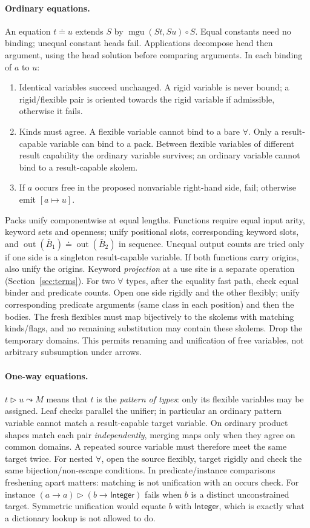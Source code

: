 \documentclass[11pt]{article}
\theoremstyle{definition}
\newcommand{\pack}{\operatorname{out}}
\newcommand{\Int}{\mathsf{Integer}}
\newcommand{\eqs}{\doteq}
\newcommand{\mgu}{\operatorname{mgu}}
\newcommand{\oneway}{\mathrel{\triangleright}}
\newcommand{\arr}{\mathbin{\to}}
\begin{document}
\paragraph{Ordinary equations.}
An equation $t\eqs u$ extends $S$ by
$\mgu(St,Su)\circ S$. Equal constants need no binding; unequal constant
heads fail. Applications decompose head then argument, using the head
solution before comparing arguments. In each binding of $a$ to $u$:
\begin{enumerate}
 \item Identical variables succeed unchanged. A rigid variable is never
 bound; a rigid/flexible pair is oriented towards the rigid variable if
 admissible, otherwise it fails.
 \item Kinds must agree. A flexible variable cannot bind to a bare $\forall$.
 Only a result-capable variable can bind to a pack. Between flexible variables
 of different result capability the ordinary variable survives; an ordinary
 variable cannot bind to a result-capable skolem.
 \item If $a$ occurs free in the proposed nonvariable right-hand side, fail;
 otherwise emit $[a\mapsto u]$.
\end{enumerate}
Packs unify componentwise at equal lengths. Functions require equal input
arity, keyword sets and openness; unify positional slots, corresponding
keyword slots, and $\pack(\bar B_1)\eqs\pack(\bar B_2)$ in sequence.
Unequal output counts are tried only if one side is a singleton
result-capable variable. If both functions carry origins, also unify the
origins. Keyword \emph{projection} at a use site is a separate operation
(Section~\ref{sec:terms}). For two $\forall$ types, after the equality fast
path, check equal binder and predicate counts. Open one side rigidly and the
other flexibly; unify corresponding predicate arguments (same class in each
position) and then the bodies. The fresh flexibles must map bijectively to
the skolems with matching kinds/flags, and no remaining substitution may
contain these skolems. Drop the temporary domains. This permits renaming
and unification of free variables, not arbitrary subsumption under arrows.

\paragraph{One-way equations.}
$t\oneway u\leadsto M$ means that $t$ is the \emph{pattern of types}:
only its flexible variables may be assigned. Leaf checks parallel the
unifier; in particular an ordinary pattern variable cannot match a
result-capable target variable. On ordinary product shapes match each pair
\emph{independently}, merging maps only when they agree on common domains.
A repeated source variable must therefore meet the same target twice.
For nested $\forall$, open the source flexibly, target rigidly and check
the same bijection/non-escape conditions. In predicate/instance comparisons
freshening apart matters: matching is not unification with an occurs check.
For instance $(a\arr a)\oneway(b\arr\Int)$ fails when $b$ is a distinct
unconstrained target. Symmetric unification would equate $b$ with $\Int$,
which is exactly what a dictionary lookup is not allowed to do.
\end{document}
